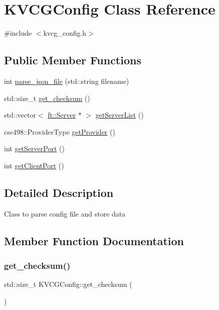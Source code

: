 \hypertarget{classKVCGConfig}{}\section{K\+V\+C\+G\+Config Class Reference}
\label{classKVCGConfig}


{\ttfamily \#include $<$kvcg\+\_\+config.\+h$>$}

\subsection*{Public Member Functions}
\begin{DoxyCompactItemize}
\item 
int \mbox{\hyperlink{classKVCGConfig_a47206f279489aacccb9200f0bf9b36cf}{parse\+\_\+json\+\_\+file}} (std\+::string filename)
\item 
std\+::size\+\_\+t \mbox{\hyperlink{classKVCGConfig_a873ecf819a05b79ccced5e5dada7843f}{get\+\_\+checksum}} ()
\item 
std\+::vector$<$ \mbox{\hyperlink{classft_1_1Server}{ft\+::\+Server}} $\ast$ $>$ \mbox{\hyperlink{classKVCGConfig_a260449f62666e968566716e2ea2c47c2}{get\+Server\+List}} ()
\item 
cse498\+::\+Provider\+Type \mbox{\hyperlink{classKVCGConfig_a66862a874ddbbe54e7b696894b970539}{get\+Provider}} ()
\item 
int \mbox{\hyperlink{classKVCGConfig_a971fafd747cbe1c95f1253d80e5549c6}{get\+Server\+Port}} ()
\item 
int \mbox{\hyperlink{classKVCGConfig_a4c25599c2f79b6ad5acd5e03526864be}{get\+Client\+Port}} ()
\end{DoxyCompactItemize}


\subsection{Detailed Description}
Class to parse config file and store data 

\subsection{Member Function Documentation}
\mbox{\label{classKVCGConfig_a873ecf819a05b79ccced5e5dada7843f}} 
\subsubsection{\texorpdfstring{get\+\_\+checksum()}{get\_checksum()}}
{\footnotesize\ttfamily std\+::size\+\_\+t K\+V\+C\+G\+Config\+::get\+\_\+checksum (\begin{DoxyParamCaption}{ }\end{DoxyParamCaption})}

